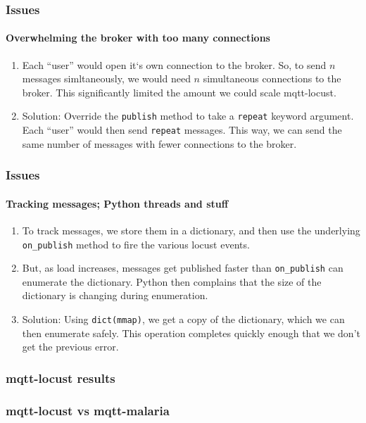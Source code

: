 \documentclass{beamer}
\begin{document}
\begin{frame}
    \frametitle{Issues}
    \framesubtitle{Overwhelming the broker with too many connections}
    \begin{enumerate}
        \item Each ``user'' would open it`s own connection to the broker. So,
        to send $n$ messages simltaneously, we would need $n$ simultaneous
        connections to the broker. This significantly limited the amount we
        could scale mqtt-locust.

        \item Solution: Override the \texttt{publish} method to take a
        \texttt{repeat} keyword argument. Each ``user'' would then send
        \texttt{repeat} messages. This way, we can send the same number of
        messages with fewer connections to the broker.
    \end{enumerate}
\end{frame}

\begin{frame}
    \frametitle{Issues}
    \framesubtitle{Tracking messages; Python threads and stuff}
    \begin{enumerate}
        \item To track messages, we store them in a dictionary, and then use
        the underlying \texttt{on\_publish} method to fire the various locust
        events.

        \item But, as load increases, messages get published faster than
        \texttt{on\_publish} can enumerate the dictionary. Python then
        complains that the size of the dictionary is changing during
        enumeration.

        \item Solution: Using \texttt{dict(mmap)}, we get a copy of the
        dictionary, which we can then enumerate safely. This operation
        completes quickly enough that we don't get the previous error.
    \end{enumerate}
\end{frame}

\begin{frame}
    \frametitle{mqtt-locust results}
\end{frame}

\begin{frame}
    \frametitle{mqtt-locust vs mqtt-malaria}
\end{frame}
\end{document}
